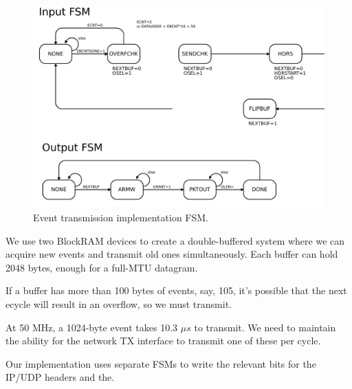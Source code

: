 \begin{figure}
\begin{centering}
\includegraphics[scale=0.8]{eventtx.fsm.svg}
\end{centering}
\caption{Event transmission implementation FSM.}
\label{eventtx.fsm}
\end{figure}

We use two BlockRAM devices to create a double-buffered system where we can acquire new events and transmit old ones simultaneously. Each buffer can hold 2048 bytes, enough for a full-MTU datagram. 

If a buffer has more than 100 bytes of events, say, 105, it's possible that the next ecycle will result in an overflow, so we must transmit. 

At 50 MHz, a 1024-byte event takes 10.3 $\mu s$ to transmit. We need to
maintain the ability for the network TX interface to transmit one of
these per cycle.

Our implementation uses separate FSMs to write the relevant bits for the IP/UDP headers and the. 

